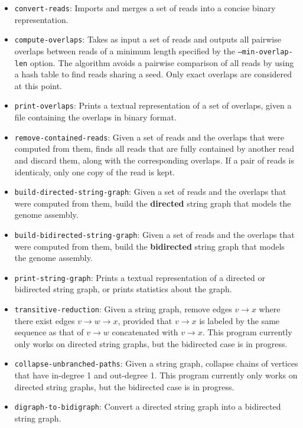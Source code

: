 \documentclass[letterpaper,12pt]{article}
\begin{document}
\begin{itemize}
\item
	{\tt convert-reads}:  Imports and merges a set of reads
	into a concise binary representation.
\item
	{\tt compute-overlaps}:  Takes as input a set of reads and outputs all
	pairwise overlaps between reads of a minimum length specified by the
	{\tt --min-overlap-len} option.  The algorithm avoids a pairwise
	comparison of all reads by using a hash table to find reads sharing a
	seed.  Only exact overlaps are considered at this point.

\item
	{\tt print-overlaps}:  Prints a textual representation of a set of
	overlaps, given a file containing the overlaps in binary format.

\item
	{\tt remove-contained-reads}:
	Given a set of reads and the overlaps that were computed from them,
	finds all reads that are fully contained by another read and discard
	them, along with the corresponding overlaps.  If a pair of reads is
	identicaly, only one copy of the read is kept.

\item
	{\tt build-directed-string-graph}:
	Given a set of reads and the overlaps that were computed from them,
	build the {\bf directed} string graph that models the genome assembly.
\item
	{\tt build-bidirected-string-graph}:
	Given a set of reads and the overlaps that were computed from them,
	build the {\bf bidirected} string graph that models the genome assembly.

\item
	{\tt print-string-graph}:
	Prints a textual representation of a directed or bidirected string
	graph, or prints statistics about the graph.

\item
	{\tt transitive-reduction}:
	Given a string graph, remove edges $v \to x$ where there exist edges $v
	\to w \to x$, provided that $v \to x$ is labeled by the same sequence as
	that of $v \to w$ concatenated with $v \to x$.  This program currently
	only works on directed string graphs, but the bidirected case is in
	progress.

\item
	{\tt collapse-unbranched-paths}:
	Given a string graph, collapse chains of vertices that have in-degree 1
	and out-degree 1.  This program currently only works on directed string
	graphs, but the bidirected case is in progress.

\item
	{\tt digraph-to-bidigraph}:
	Convert a directed string graph into a bidirected string graph.

\end{itemize}
\end{document}
